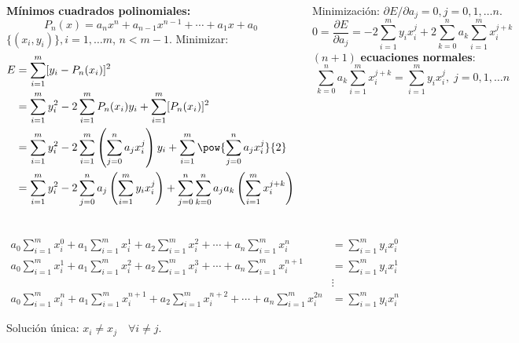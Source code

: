 \documentclass[9pt, aspectratio=169]{beamer}
\begin{document}
\begin{frame}
	\begin{columns}[t]
		\cx
		\textbf{Mínimos cuadrados polinomiales:}
		\[ P_n(x) = a_n x^n + a_{n-1} x^{n-1} + \cdots + a_1 x + a_0 \]
		$\{(x_i, y_i)\}, i = 1, \ldots m$, $n < m-1$. Minimizar:
		\begin{align*}
			E & = \sum_{i=1}^m [y_i - P_n(x_i)]^2                                                                                                                        \\
			  & = \sum_{i=1}^m y_i^2 - 2 \sum_{i=1}^m P_n(x_i) y_i + \sum_{i=1}^m [P_n(x_i)]^2                                                                           \\
			  & = \sum_{i=1}^m y_i^2 -2 \sum_{i=1}^m \left(\sum_{j=0}^n a_j x_i^j \right) y_i + \sum_{i=1}^m \pow{\sum_{j=0}^n a_j x_i^j}{2}                             \\
			  & = \sum_{i=1}^m y_i^2 -2 \sum_{j=0}^n a_j \left( \sum_{i=1}^m y_i x_i^j \right) + \sum_{j=0}^n \sum_{k=0}^n a_j a_k \left( \sum_{i=1}^m x_i^{j+k} \right)
		\end{align*}
		\pause

		Minimización: $\partial E / \partial a_j = 0, j = 0, 1, \ldots n$.
		\[ 0 = \frac{\partial E}{\partial a_j} = -2 \sum_{i=1}^m y_i x_i^j + 2 \sum_{k=0}^na_k \sum_{i=1}^m x_i^{j+k} \]
		$(n+1)$ \textbf{ecuaciones normales}:
		\[ \sum_{k=0}^n a_k \sum_{i=1}^m x_i^{j+k} = \sum_{i=1}^m y_i x_i^j, \; j=0, 1, \ldots n \]
	\end{columns}
\end{frame}

\begin{frame}
	\begin{align*}
		a_0 \sum_{i=1}^m x_i^0 + a_1 \sum_{i=1}^m x_i^1 + a_2 \sum_{i=1}^m x_i^2 + \cdots + a_n \sum_{i=1}^m x_i^n            & = \sum_{i=1}^m y_i x_i^0 \\
		a_0 \sum_{i=1}^m x_i^1 + a_1 \sum_{i=1}^m x_i^2 + a_2 \sum_{i=1}^m x_i^3 + \cdots + a_n \sum_{i=1}^m x_i^{n+1}        & = \sum_{i=1}^m y_i x_i^1 \\
		                                                                                                                      & \vdots                   \\
		a_0 \sum_{i=1}^m x_i^n + a_1 \sum_{i=1}^m x_i^{n+1} + a_2 \sum_{i=1}^m x_i^{n+2} + \cdots + a_n \sum_{i=1}^m x_i^{2n} & = \sum_{i=1}^m y_i x_i^n
	\end{align*}

	\centering \alert{Solución única:} $x_i \neq x_j \quad \forall i \neq j$.
\end{frame}
\end{document}
